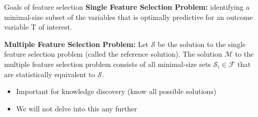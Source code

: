 \documentclass[11pt,compress,t,notes=noshow, xcolor=table]{beamer}
\begin{document}
\begin{frame}{Goals of feature selection}
\vfill
\textbf{Single Feature Selection Problem:} identifying a minimal-size subset of the variables that is optimally predictive for an outcome variable T of interest.

\vfill

\textbf{Multiple Feature Selection Problem:} Let $\mathcal{S}$ be the solution to the single feature selection problem (called the reference solution). The solution $\mathcal{M}$ to the multiple feature selection problem consists of all minimal-size sets $\mathcal{S}_i \in \mathcal{F}$  that are statistically equivalent to $\mathcal{S}$.
\begin{itemize}
    \item Important for knowledge discovery (know all possible solutions)
    \item We will not delve into this any further
\end{itemize}
\vfill
\end{frame}

% 
\end{document}
